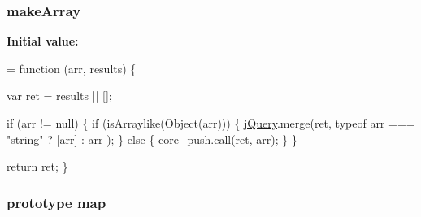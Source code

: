 \subsubsection[{\texorpdfstring{make\+Array}{makeArray}}]{ make\+Array}\hypertarget{jquery-2_82_81-vsdoc_8js_aeb415829cbd66d6538dadc5de9adc5ab}{}\label{jquery-2_82_81-vsdoc_8js_aeb415829cbd66d6538dadc5de9adc5ab}
{\bfseries Initial value\+:}
\begin{DoxyCode}
= \textcolor{keyword}{function} (arr, results) \{
        

        var ret = results || [];

        \textcolor{keywordflow}{if} (arr != null) \{
            \textcolor{keywordflow}{if} (isArraylike(Object(arr))) \{
                \hyperlink{jquery-2_82_81-vsdoc_8js_add5237586d970a38a81f990e8eb28c6c}{jQuery}.merge(ret,
                    typeof arr === \textcolor{stringliteral}{"string"} ?
                    [arr] : arr
                );
            \} \textcolor{keywordflow}{else} \{
                core\_push.call(ret, arr);
            \}
        \}

        \textcolor{keywordflow}{return} ret;
    \}
\end{DoxyCode}
\subsubsection[{\texorpdfstring{map}{map}}]{ {\bf prototype} map}\hypertarget{jquery-2_82_81-vsdoc_8js_a20838f8c4bedc779e51bf830f5a4d471}{}\label{jquery-2_82_81-vsdoc_8js_a20838f8c4bedc779e51bf830f5a4d471}
